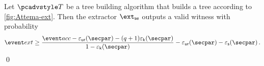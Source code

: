 	\begin{corollary}
		Let $\tdv$ be a tree building algorithm that builds a tree according to \cref{fig:Attema-ext}. Then the extractor $\extse$ outputs a valid witness with probability 
		\begin{equation}
			\label{eq:frk}
			\extProb \geq \frac{\accProb - \epsur(\secpar) - (q + 1) \epsk(\secpar)}{1 - \epsk(\secpar)} 
			- \epsur(\secpar) - \epss(\secpar)\,.
			\end{equation} 
	\qed
\end{corollary}


